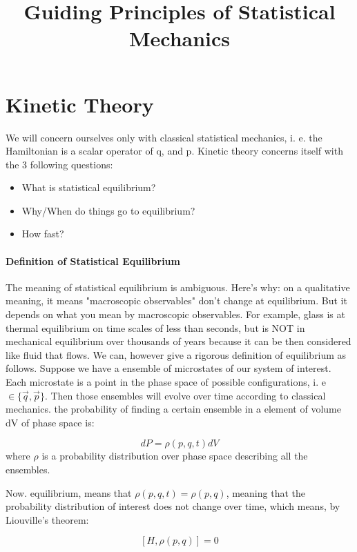 \documentclass[12pt]{article}
\title{Guiding Principles of Statistical Mechanics}
\begin{document}
\maketitle

\section{Kinetic Theory}

We will concern ourselves only with classical statistical mechanics, i. e. the Hamiltonian is a scalar operator of q, and p.  Kinetic theory concerns itself with the 3 following questions:


\begin{itemize}
\item What is statistical equilibrium?
\item Why/When do things go to equilibrium?
\item How fast?
\end{itemize}

\paragraph{Definition of Statistical Equilibrium}

The meaning of statistical equilibrium is ambiguous.  Here's why:  on a qualitative meaning, it means "macroscopic observables" don't change at equilibrium.  But it depends on what you mean by macroscopic observables.  For example, glass is at thermal equilibrium on time scales of less than seconds, but is NOT in mechanical equilibrium over thousands of years because it can be then considered like fluid that flows.  We can, however give a rigorous definition of equilibrium as follows.  Suppose we have a ensemble of microstates of our system of interest.  Each microstate is a point in the phase space of possible configurations, i. e $\in \{ \vec{q}, \vec{p} \}$.  Then those ensembles will evolve over time according to classical mechanics.  the probability of finding a certain ensemble in a element of volume dV of phase space is:

$$ dP = \rho(p, q,t)dV$$
where $\rho$ is a probability distribution over phase space describing all the ensembles.

Now. equilibrium, means that $\rho(p,q,t)= \rho(p,q)$, meaning that the probability distribution of interest does not change over time, which means, by Liouville's theorem:

$$[H, \rho(p,q)]= 0$$
\end{document}
